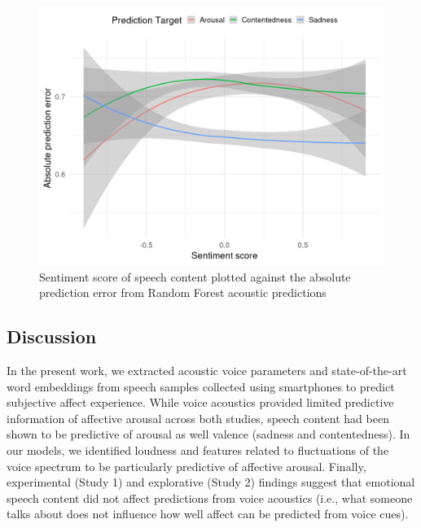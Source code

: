 \documentclass[
  man,floatsintext]{apa6}
\begin{document}
\begin{figure}

{\centering \includegraphics[width=1\linewidth]{../figures/sentiment_error_plot} 

}

\caption[Content sentiment and voice prediction error]{Sentiment score of speech content plotted against the absolute prediction error from Random Forest acoustic predictions}\label{fig:uscontenteffect}
\end{figure}

\newpage

\hypertarget{discussion}{%
\subsection{Discussion}\label{discussion}}

In the present work, we extracted acoustic voice parameters and state-of-the-art word embeddings from speech samples collected using smartphones to predict subjective affect experience. While voice acoustics provided limited predictive information of affective arousal across both studies, speech content had been shown to be predictive of arousal as well valence (sadness and contentedness). In our models, we identified loudness and features related to fluctuations of the voice spectrum to be particularly predictive of affective arousal. Finally, experimental (Study 1) and explorative (Study 2) findings suggest that emotional speech content did not affect predictions from voice acoustics (i.e., what someone talks about does not influence how well affect can be predicted from voice cues).
\end{document}
